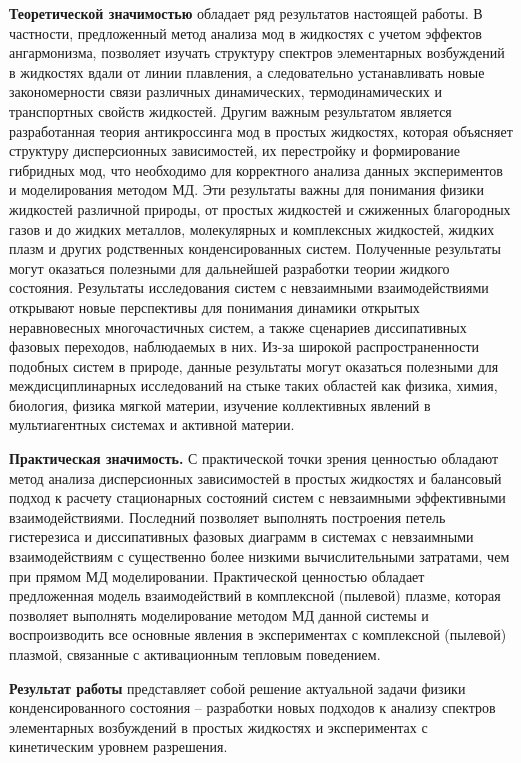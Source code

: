 \textbf{Теоретической значимостью} обладает ряд результатов настоящей работы.
В частности, предложенный метод анализа мод в жидкостях с учетом эффектов ангармонизма, позволяет изучать структуру спектров элементарных возбуждений в жидкостях вдали от линии плавления, а следовательно устанавливать новые закономерности связи различных динамических, термодинамических и транспортных свойств жидкостей.
Другим важным результатом является разработанная теория антикроссинга мод в простых жидкостях, которая объясняет структуру дисперсионных зависимостей, их перестройку и формирование гибридных мод, что необходимо для корректного анализа данных экспериментов и моделирования методом МД.
Эти результаты важны для понимания физики жидкостей различной природы,
от простых жидкостей и сжиженных благородных газов и до жидких металлов, молекулярных и комплексных жидкостей, жидких плазм и других родственных конденсированных систем.
Полученные результаты могут оказаться полезными для дальнейшей разработки теории жидкого состояния. Результаты исследования систем с невзаимными взаимодействиями открывают новые перспективы для понимания динамики открытых неравновесных многочастичных систем, а также сценариев диссипативных фазовых переходов, наблюдаемых в них.
Из-за широкой распространенности подобных систем в природе, данные результаты могут оказаться полезными для междисциплинарных исследований на стыке таких областей как физика, химия, биология, физика мягкой материи, изучение коллективных явлений в мультиагентных системах и активной материи.

\textbf{Практическая значимость.} С практической точки зрения ценностью обладают метод анализа дисперсионных зависимостей в простых жидкостях и балансовый подход к расчету стационарных состояний систем с невзаимными эффективными взаимодействиями. Последний позволяет выполнять построения петель гистерезиса и диссипативных фазовых диаграмм в системах с невзаимными взаимодействиям с существенно более низкими вычислительными затратами, чем при прямом МД моделировании.
Практической ценностью обладает предложенная модель взаимодействий в комплексной (пылевой) плазме, которая позволяет выполнять моделирование методом МД данной системы и воспроизводить все основные явления в экспериментах с комплексной (пылевой) плазмой, связанные с активационным тепловым поведением.

\textbf{Результат работы} представляет собой решение актуальной задачи физики конденсированного состояния -- разработки новых подходов к анализу спектров элементарных возбуждений в простых жидкостях и экспериментах с кинетическим уровнем разрешения.

